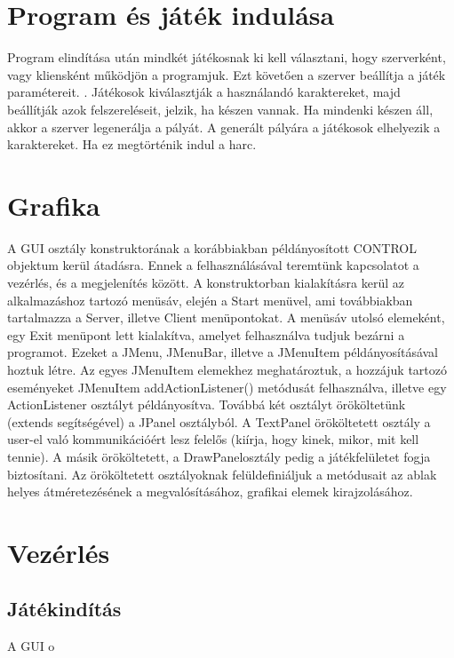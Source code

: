 \section{Program és játék indulása}
Program elindítása után mindkét játékosnak ki kell választani, hogy szerverként, vagy kliensként működjön a programjuk. Ezt követően a szerver beállítja a játék paramétereit. . Játékosok kiválasztják a használandó karaktereket, majd beállítják azok felszereléseit, jelzik, ha készen vannak.
Ha mindenki készen áll, akkor a szerver legenerálja a pályát. A generált pályára a játékosok elhelyezik a karaktereket. Ha ez megtörténik indul a harc.

\section{Grafika}
A GUI osztály konstruktorának a korábbiakban példányosított CONTROL objektum kerül átadásra. Ennek a felhasználásával teremtünk kapcsolatot a vezérlés, és a megjelenítés között. A konstruktorban kialakításra kerül az alkalmazáshoz tartozó menüsáv, elején a Start menüvel, ami továbbiakban tartalmazza a Server, illetve Client menüpontokat. A menüsáv utolsó elemeként, egy Exit menüpont lett
kialakítva, amelyet felhasználva tudjuk bezárni a programot. Ezeket a JMenu, JMenuBar, illetve a JMenuItem példányosításával hoztuk létre. Az egyes JMenuItem elemekhez meghatároztuk, a hozzájuk tartozó eseményeket JMenuItem addActionListener() metódusát felhasználva, illetve egy ActionListener osztályt példányosítva.
Továbbá két osztályt örököltetünk (extends segítségével) a JPanel osztályból. A TextPanel örököltetett osztály a user-el való kommunikációért lesz felelős (kiírja, hogy kinek, mikor, mit
kell tennie). A másik örököltetett, a DrawPanelosztály pedig a játékfelületet fogja biztosítani.
Az örököltetett osztályoknak felüldefiniáljuk a metódusait az ablak helyes átméretezésének a
megvalósításához, grafikai elemek kirajzolásához.



\section{Vezérlés}
\subsection{Játékindítás}
A GUI o
